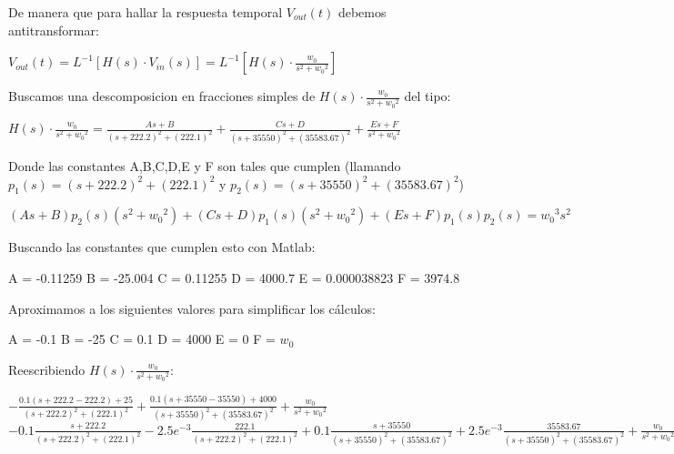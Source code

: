 \documentclass[12pt, titlepage]{article}
\begin{document}
    De manera que para hallar la respuesta temporal $V_{out}(t)$ debemos antitransformar:
        \begin{center}
        $V_{out}(t) = L^{-1}[H(s) \cdot V_{in}(s)] = L^{-1}[H(s) \cdot\frac{w_0}{s^2+{w_0}^2}]$
    \end{center}
    
    Buscamos una descomposicion en fracciones simples de $H(s) \cdot\frac{w_0}{s^2+{w_0}^2}$ del tipo:
    
    \begin{center}
        
    $H(s) \cdot\frac{w_0}{s^2+{w_0}^2} = \frac{A s + B}{(s+222.2)^2 + (222.1)^2} +  \frac{Cs + D}{(s+35550)^2  + (35583.67)^2} + \frac{Es+F}{s^2+{w_0}^2}$
    \end{center}
    
    Donde las constantes A,B,C,D,E y F son tales que cumplen (llamando $p_1(s) = (s+222.2)^2 + (222.1)^2 $ y $p_2(s) = (s+35550)^2  + (35583.67)^2$)
    
    \begin{center}
        $ (As+B)p_2(s)(s^2+{w_0}^2)+(Cs+D)p_1(s)(s^2+{w_0}^2)+(Es+F)p_1(s)p_2(s) = {w_0}^3s^2$
    \end{center}
   
   Buscando las constantes que cumplen esto con Matlab:
    
    \begin{center}
    A = -0.11259
    B = -25.004
    C = 0.11255 
    D = 4000.7
    E = 0.000038823 
    F = 3974.8
    \end{center}

    Aproximamos a los siguientes valores para simplificar los cálculos:
    
    \begin{center}
    A = -0.1
    B = -25
    C = 0.1 
    D = 4000
    E = 0 
    F = $w_0$
    \end{center}
    
    Reescribiendo $H(s) \cdot\frac{w_0}{s^2+{w_0}^2}$: 
    
    \begin{center}
        $-\frac{0.1 (s+222.2-222.2) + 25}{(s+222.2)^2 + (222.1)^2} +  \frac{0.1(s+35550-35550) + 4000}{(s+35550)^2  + (35583.67)^2} + \frac{w_0}{s^2+{w_0}^2}$\\
        \vspace{5mm}
        \footnotesize$-0.1\frac{s+222.2}{(s+222.2)^2 + (222.1)^2}-2.5e^{-3}\frac{222.1}{(s+222.2)^2 + (222.1)^2}+0.1\frac{s+35550}{(s+35550)^2+(35583.67)^2}+2.5e^{-3}\frac{35583.67}{(s+35550)^2+(35583.67)^2} +\frac{w_0}{s^2+{w_0}^2}$
    \end{center}
    
\end{document}
